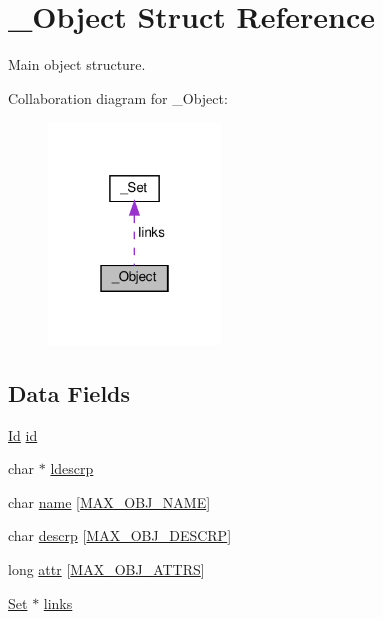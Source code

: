 \hypertarget{struct__Object}{}\section{\+\_\+\+Object Struct Reference}
\label{struct__Object}


Main object structure.  




Collaboration diagram for \+\_\+\+Object\+:
\nopagebreak
\begin{figure}[H]
\begin{center}
\leavevmode
\includegraphics[width=130pt]{struct__Object__coll__graph}
\end{center}
\end{figure}
\subsection*{Data Fields}
\begin{DoxyCompactItemize}
\item 
\hyperlink{types_8h_a845e604fb28f7e3d97549da3448149d3}{Id} \hyperlink{struct__Object_a3cff7a0e8dc4e9d23895ed9af1b7653a}{id}
\item 
char $\ast$ \hyperlink{struct__Object_ab2d033c018fbe2639c88561e55306832}{ldescrp}
\item 
char \hyperlink{struct__Object_a59556463a256cec309077768589f10a8}{name} \mbox{[}\hyperlink{object_8h_a6a2f391825e94d06a3137b75abfa1bba}{M\+A\+X\+\_\+\+O\+B\+J\+\_\+\+N\+A\+ME}\mbox{]}
\item 
char \hyperlink{struct__Object_affa493ad8fdeafe924950f7388356a55}{descrp} \mbox{[}\hyperlink{object_8h_a9c396da2f3b9f0191120ff1666af6381}{M\+A\+X\+\_\+\+O\+B\+J\+\_\+\+D\+E\+S\+C\+RP}\mbox{]}
\item 
long \hyperlink{struct__Object_a9074217e572100d1259487a818bb0a0a}{attr} \mbox{[}\hyperlink{object_8h_a6b252b064231d7dc71c194dfea24b32b}{M\+A\+X\+\_\+\+O\+B\+J\+\_\+\+A\+T\+T\+RS}\mbox{]}
\item 
\hyperlink{set_8h_a6d3b7f7c92cbb4577ef3ef7ddbf93161}{Set} $\ast$ \hyperlink{struct__Object_afd29bc78dd0fc104db1aab87c6fc7d5c}{links}
\end{DoxyCompactItemize}


